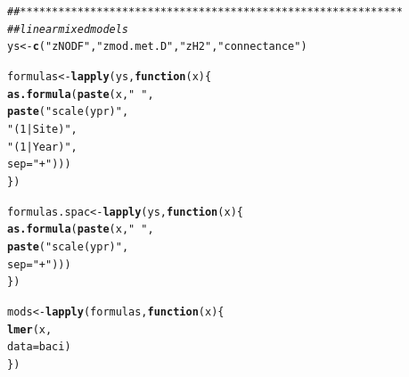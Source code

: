 \documentclass{article}\usepackage[]{graphicx}\usepackage[]{color}
\makeatletter
\newcommand{\hlstr}[1]{\textcolor[rgb]{0.192,0.494,0.8}{#1}}%
\newcommand{\hlcom}[1]{\textcolor[rgb]{0.678,0.584,0.686}{\textit{#1}}}%
\newcommand{\hlstd}[1]{\textcolor[rgb]{0.345,0.345,0.345}{#1}}%
\newcommand{\hlkwa}[1]{\textcolor[rgb]{0.161,0.373,0.58}{\textbf{#1}}}%
\newcommand{\hlkwb}[1]{\textcolor[rgb]{0.69,0.353,0.396}{#1}}%
\newcommand{\hlkwc}[1]{\textcolor[rgb]{0.333,0.667,0.333}{#1}}%
\newcommand{\hlkwd}[1]{\textcolor[rgb]{0.737,0.353,0.396}{\textbf{#1}}}%
\newenvironment{kframe}{%
 \def\at@end@of@kframe{}%
 \ifinner\ifhmode%
  \def\at@end@of@kframe{\end{minipage}}%
  \begin{minipage}{\columnwidth}%
 \fi\fi%
 \def\FrameCommand##1{\hskip\@totalleftmargin \hskip-\fboxsep
 \colorbox{shadecolor}{##1}\hskip-\fboxsep
     \hskip-\linewidth \hskip-\@totalleftmargin \hskip\columnwidth}%
 \MakeFramed {\advance\hsize-\width
   \@totalleftmargin\z@ \linewidth\hsize
   \@setminipage}}%
 {\par\unskip\endMakeFramed%
 \at@end@of@kframe}
\newenvironment{knitrout}{}{} %
\makeatother
\begin{document}
\begin{knitrout}
\color{fgcolor}\begin{kframe}
\begin{alltt}
\hlcom{## ************************************************************}
\hlcom{## linear mixed models}
\hlstd{ys} \hlkwb{<-} \hlkwd{c}\hlstd{(}\hlstr{"zNODF"}\hlstd{,} \hlstr{"zmod.met.D"}\hlstd{,} \hlstr{"zH2"}\hlstd{,} \hlstr{"connectance"}\hlstd{)}

\hlstd{formulas} \hlkwb{<-}\hlkwd{lapply}\hlstd{(ys,} \hlkwa{function}\hlstd{(}\hlkwc{x}\hlstd{) \{}
    \hlkwd{as.formula}\hlstd{(}\hlkwd{paste}\hlstd{(x,} \hlstr{"~"}\hlstd{,}
                     \hlkwd{paste}\hlstd{(}\hlstr{"scale(ypr)"}\hlstd{,}
                           \hlstr{"(1|Site)"}\hlstd{,}
                           \hlstr{"(1|Year)"}\hlstd{,}
                           \hlkwc{sep}\hlstd{=}\hlstr{"+"}\hlstd{)))}
\hlstd{\})}

\hlstd{formulas.spac} \hlkwb{<-}\hlkwd{lapply}\hlstd{(ys,} \hlkwa{function}\hlstd{(}\hlkwc{x}\hlstd{) \{}
    \hlkwd{as.formula}\hlstd{(}\hlkwd{paste}\hlstd{(x,} \hlstr{"~"}\hlstd{,}
                     \hlkwd{paste}\hlstd{(}\hlstr{"scale(ypr)"}\hlstd{,}
                           \hlkwc{sep}\hlstd{=}\hlstr{"+"}\hlstd{)))}
\hlstd{\})}

\hlstd{mods} \hlkwb{<-} \hlkwd{lapply}\hlstd{(formulas,} \hlkwa{function}\hlstd{(}\hlkwc{x}\hlstd{)\{}
    \hlkwd{lmer}\hlstd{(x,}
         \hlkwc{data}\hlstd{=baci)}
\hlstd{\})}


\end{alltt}
\end{kframe}
\end{knitrout}
\end{document}
